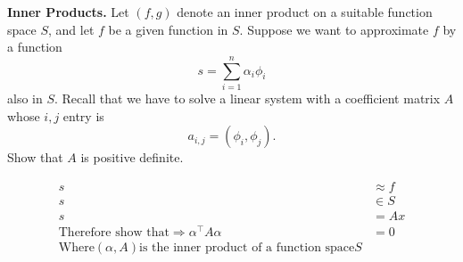 \textbf{Inner Products.} Let $(f, g)$ denote an inner product on a
suitable function space $S$, and let $f$ be a given function in $S$.
Suppose we want to approximate $f$ by a function \[s = \sum_{i=1}^n
\alpha_i \phi_i\] also in $S$. Recall that we have to solve a linear
system with a coefficient matrix $A$ whose $i,j$ entry is \[a_{i,j} =
(\phi_i, \phi_j).\] Show that $A$ is positive definite.

{\color{blue}

\[
\begin{aligned}
s &\approx f \\
s &\in S \\
s &= A x \\
\text{Therefore show that}
\Rightarrow \alpha^\intercal A \alpha &= 0 \\
\text{Where} (\alpha, A) \text{is the inner product of a function
space} S
\end{aligned}
\]

}
